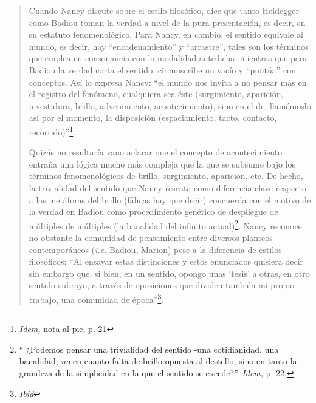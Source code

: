 \begin{quote}
Cuando Nancy discute sobre el estilo filosófico, dice que tanto Heidegger como Badiou toman la verdad a nivel de la pura presentación, es decir, en su estatuto fenomenológico. Para Nancy, en cambio, el sentido equivale al mundo, es decir, hay \enquote{encadenamiento} y \enquote{arrastre}, tales son los términos que emplea en consonancia con la modalidad antedicha; mientras que para Badiou la verdad corta el sentido, circunscribe un vacío y  \enquote{puntúa} con conceptos. Así lo expresa Nancy: \enquote{el mundo nos invita a no pensar más en el registro del fenómeno, cualquiera sea éste (surgimiento, aparición, investidura, brillo, advenimiento, acontecimiento), sino en el de, llamémoslo así por el momento, la disposición (espaciamiento, tacto, contacto, recorrido)}\footnote{\emph{Idem,} nota al pie, p. 21}.

Quizás no resultaría vano aclarar que el concepto de acontecimiento entraña una lógica mucho más compleja que la que se subsume bajo los términos fenomenológicos de brillo, surgimiento, aparición, etc. De hecho, la trivialidad del sentido que Nancy rescata como diferencia clave respecto a las metáforas del brillo (fálicas hay que decir) concuerda con el motivo de la verdad en Badiou como procedimiento genérico de despliegue de múltiples de múltiples (la banalidad del infinito actual)\footnote{\enquote{ ¿Podemos pensar una trivialidad del sentido -una cotidianidad, una banalidad, \emph{no} en cuanto falta de brillo opuesta al destello, sino en tanto la grandeza de la simplicidad en la que el sentido se excede?}. \emph{Idem,} p. 22.}. Nancy reconoce no obstante la comunidad de pensamiento entre diversos planteos contemporáneos (\emph{i.e.} Badiou, Marion) pese a la diferencia de estilos filosóficos: \enquote{Al ensayar estas distinciones y estos enunciados quisiera decir sin embargo que, si bien, en un sentido, opongo unas \enquote{tesis} a otras, en otro sentido subrayo, a través de oposiciones que dividen también mi propio trabajo, una comunidad de época}\footnote{\emph{Ibid}}.


\end{quote}
